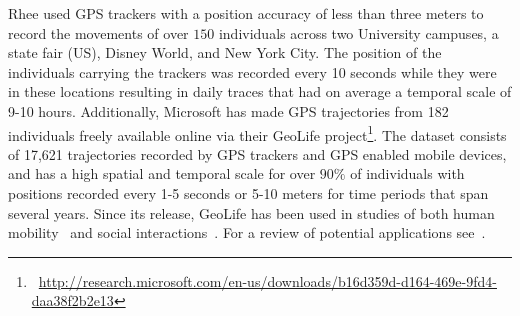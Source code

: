 Rhee \et\cite{shin_2008_levy} used GPS trackers with a position accuracy of less than three meters to record the movements of over $150$ individuals across two University campuses, a state fair (US), Disney World, and New York City. The position of the individuals carrying the trackers was recorded every 10 seconds while they were in these locations resulting in daily traces that had on average a temporal scale of 9-10 hours. Additionally, Microsoft has made GPS trajectories from 182 individuals freely available online via their GeoLife project\footnote{~\url{http://research.microsoft.com/en-us/downloads/b16d359d-d164-469e-9fd4-daa38f2b2e13}}. 
The dataset consists of 17,621 trajectories recorded by GPS trackers and GPS enabled mobile devices, and has a high spatial and temporal scale for over $90\%$ of individuals with positions recorded every 1-5 seconds or 5-10 meters for time periods that span several years. Since its release, GeoLife has been used in studies of both human mobility~\cite{zheng_2008_understanding, zheng_2009_mining} and social interactions~\cite{li_2008_mining}. For a review of potential applications see~\cite{zheng_2010_geolife}. 

